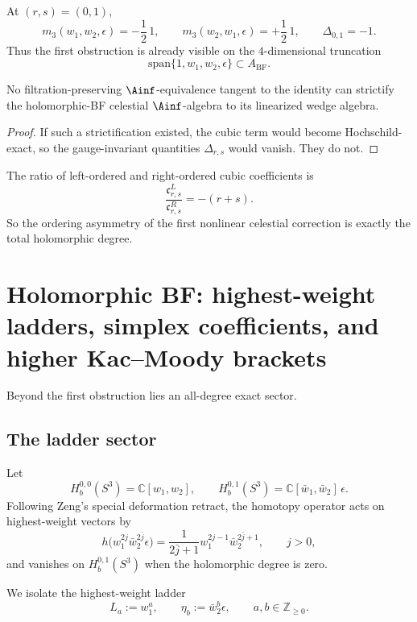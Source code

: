 \begin{corollary}
At $(r,s)=(0,1)$,
\[
m_3(w_1,w_2,\epsilon)=-\frac12\,1,
\qquad
m_3(w_2,w_1,\epsilon)=+\frac12\,1,
\qquad
\Delta_{0,1}=-1.
\]
Thus the first obstruction is already visible on the $4$-dimensional truncation
\[
\mathrm{span}\{1,w_1,w_2,\epsilon\}\subset A_{\mathrm{BF}}.
\]
\end{corollary}

\begin{corollary}
No filtration-preserving $\Ainf$-equivalence tangent to the identity can strictify the holomorphic-BF celestial $\Ainf$-algebra to its linearized wedge algebra.
\end{corollary}

\begin{proof}
If such a strictification existed, the cubic term would become Hochschild-exact, so the gauge-invariant quantities $\Delta_{r,s}$ would vanish. They do not.
\end{proof}

\begin{corollary}
The ratio of left-ordered and right-ordered cubic coefficients is
\[
\frac{\mathfrak c^L_{r,s}}{\mathfrak c^R_{r,s}}=-(r+s).
\]
So the ordering asymmetry of the first nonlinear celestial correction is exactly the total holomorphic degree.
\end{corollary}

\section{Holomorphic BF: highest-weight ladders, simplex coefficients, and higher Kac--Moody brackets}

Beyond the first obstruction lies an all-degree exact sector.

\subsection{The ladder sector}

Let
\[
H_b^{0,0}(S^3)=\mathbb{C}[w_1,w_2],
\qquad
H_b^{0,1}(S^3)=\mathbb{C}[\bar w_1,\bar w_2]\,\epsilon.
\]
Following Zeng's special deformation retract, the homotopy operator acts on highest-weight vectors by
\[
h\bigl(w_1^{2j}\bar w_2^{2\bar j}\epsilon\bigr)
=
\frac{1}{2\bar j+1}w_1^{2j-1}\bar w_2^{2\bar j+1},
\qquad j>0,
\]
and vanishes on $H_b^{0,1}(S^3)$ when the holomorphic degree is zero.

We isolate the highest-weight ladder
\[
L_a:=w_1^a,
\qquad
\eta_b:=\bar w_2^b\epsilon,
\qquad a,b\in \mathbb Z_{\ge0}.
\]

